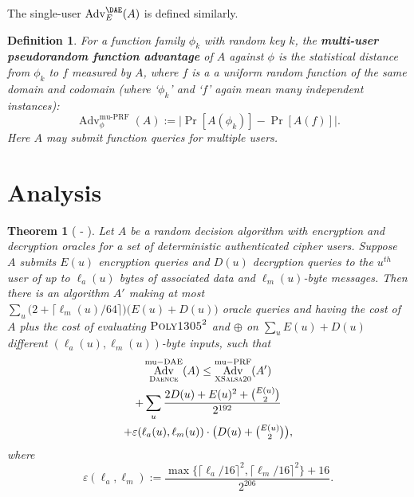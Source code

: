 \documentclass[draft]{article}
\newtheorem{definition}{Definition}
\newtheorem{theorem}{Theorem}
\newcommand{\term}[1]{\textbf{#1}}
\def\operatorsc#1{{%
  \ifmmode\let\next=\operatorname\else\let\next=\relax\fi\next{\textsc{#1}}}}
\def\Salsa#1/{\operatorsc{Salsa#1}}
\def\XSalsa#1/{\operatorsc{XSalsa#1}}
\def\Poly#1/{\operatorsc{Poly#1}}
\def\Daence/{\operatorsc{Daence}}
\DeclareMathOperator{\Adv}{Adv}
\DeclareMathOperator{\muDAE}{mu-DAE}
\DeclareMathOperator{\muPRF}{mu-PRF}
\newcommand{\collisionbound}{\varepsilon}
\begin{document}
The single-user $\Adv^{\DAE}_E(A)$ is defined similarly.

\begin{definition}
  For a function family $\phi_k$ with random key $k$, the
   \term{multi-user pseudorandom function advantage}
   of $A$ against $\phi$ is the statistical distance from $\phi_k$ to
   $f$ measured by $A$, where $f$ is a a uniform random function of
   the same domain and codomain (where `$\phi_k$' and `$f$' again
   mean many independent instances):
  \[
    \Adv^{\muPRF}_\phi(A) := \lvert\Pr[A(\phi_k)] - \Pr[A(f)]\rvert.
  \]
  Here $A$ may submit function queries for \emph{multiple} users.
\end{definition}

\section{Analysis}

\begin{theorem}[\Salsa20/-\Daence/]\label{thm-salsa20-daence}
  Let $A$ be a random decision algorithm with encryption and
   decryption oracles for a set of deterministic authenticated
   cipher users.
  Suppose $A$ submits $E(u)$ encryption queries and $D(u)$ decryption
   queries to the $u^{\mathit{th}}$ user of up to $\ell_a(u)$ bytes of
   associated data and $\ell_m(u)$-byte messages.
  Then there is an algorithm $A'$ making at most
   $\sum_u \bigl(2 + \lceil\ell_m(u)/64\rceil\bigr)
     \bigl(E(u) + D(u)\bigr)$
   oracle queries and having the cost of $A$ plus the cost of
   evaluating $\Poly1305/^2$ and $\oplus$ on
   $\sum_u E(u) + D(u)$
   different $(\ell_a(u), \ell_m(u))$-byte inputs,
   such that
%
  \begin{multline*}
    \Adv^{\muDAE}_{\Daence/}(A)
     \leq \Adv^{\muPRF}_{\XSalsa20/}(A') \\
            + \sum_u
                \frac{2 D(u) + E(u)^2 + \binom{E(u)}{2}}
                     {2^{192}} \\
                + \collisionbound(\ell_a(u), \ell_m(u))
                  \cdot
                  {\textstyle\bigl(D(u) + \binom{E(u)}{2}\bigr)},
  \end{multline*}
%
   where
  \[
    \collisionbound(\ell_a, \ell_m)
    := \frac{\max\{\lceil\ell_a/16\rceil^2, \lceil\ell_m/16\rceil^2\}
             + 16}
            {2^{206}}.
  \]
\end{theorem}
\end{document}
